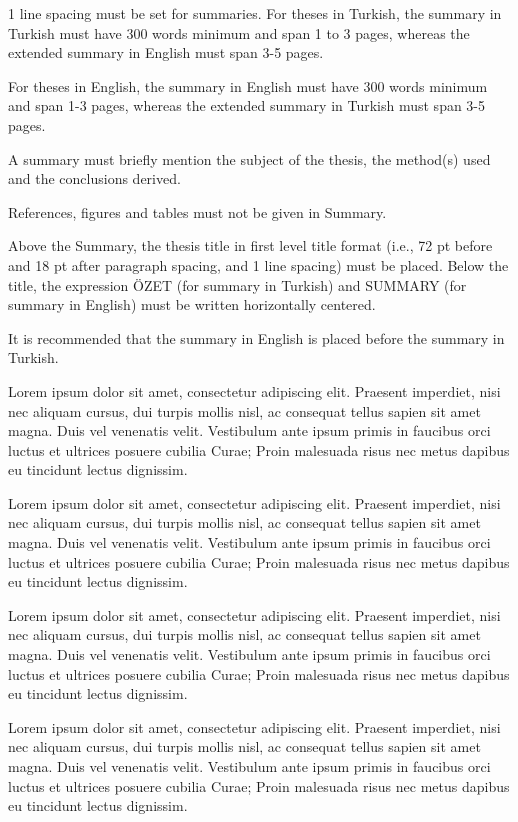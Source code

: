 1 line spacing must be set for summaries. For theses in Turkish, the summary in Turkish must have 300 words minimum and span 1 to 3 pages, whereas the extended summary in English must span 3-5 pages.

For theses in English, the summary in English must have 300 words minimum and span 1-3 pages, whereas the extended summary in Turkish must span 3-5 pages.

A summary must briefly mention the subject of the thesis, the method(s) used and the conclusions derived.

References, figures and tables must not be given in Summary.

Above the Summary, the thesis title in first level title format (i.e., 72 pt before and 18 pt after paragraph spacing, and 1 line spacing) must be placed. Below the title, the expression ÖZET (for summary in Turkish) and SUMMARY (for summary in English) must be written horizontally centered.

It is recommended that the summary in English is placed before the summary in Turkish.


Lorem ipsum dolor sit amet, consectetur adipiscing elit. Praesent imperdiet, nisi 
nec aliquam cursus, dui turpis mollis nisl, ac consequat tellus sapien sit amet 
magna. Duis vel venenatis velit. Vestibulum ante ipsum primis in faucibus orci 
luctus et ultrices posuere cubilia Curae; Proin malesuada risus nec metus dapibus 
eu tincidunt lectus dignissim. 

Lorem ipsum dolor sit amet, consectetur adipiscing elit. Praesent imperdiet, nisi 
nec aliquam cursus, dui turpis mollis nisl, ac consequat tellus sapien sit amet 
magna. Duis vel venenatis velit. Vestibulum ante ipsum primis in faucibus orci 
luctus et ultrices posuere cubilia Curae; Proin malesuada risus nec metus dapibus 
eu tincidunt lectus dignissim. 

Lorem ipsum dolor sit amet, consectetur adipiscing elit. Praesent imperdiet, nisi 
nec aliquam cursus, dui turpis mollis nisl, ac consequat tellus sapien sit amet 
magna. Duis vel venenatis velit. Vestibulum ante ipsum primis in faucibus orci 
luctus et ultrices posuere cubilia Curae; Proin malesuada risus nec metus dapibus 
eu tincidunt lectus dignissim. 

Lorem ipsum dolor sit amet, consectetur adipiscing elit. Praesent imperdiet, nisi 
nec aliquam cursus, dui turpis mollis nisl, ac consequat tellus sapien sit amet 
magna. Duis vel venenatis velit. Vestibulum ante ipsum primis in faucibus orci 
luctus et ultrices posuere cubilia Curae; Proin malesuada risus nec metus dapibus 
eu tincidunt lectus dignissim. 

